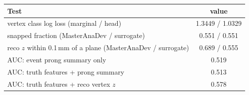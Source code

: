 \begin{tabular}{lc}
\toprule
Test & value \\
\midrule
vertex class log loss (marginal / head) & 1.3449 / 1.0329 \\
snapped fraction (MasterAnaDev / surrogate) & 0.551 / 0.551 \\
reco $z$ within 0.1\,mm of a plane (MasterAnaDev / surrogate) & 0.689 / 0.555 \\
\midrule
AUC: event prong summary only & 0.519 \\
AUC: truth features + prong summary & 0.513 \\
AUC: truth features + reco vertex $z$ & 0.578 \\
\bottomrule
\end{tabular}
